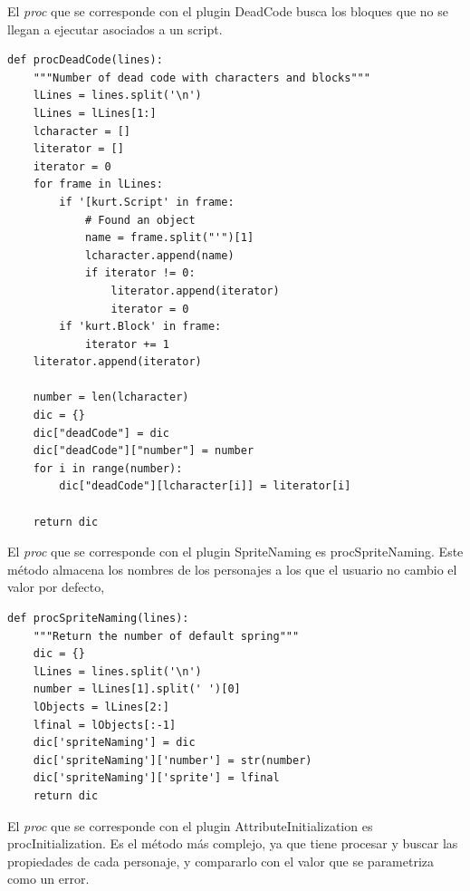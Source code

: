 \documentclass[a4paper, 12pt]{book}
\begin{document}
El \emph{proc} que se corresponde con el plugin DeadCode busca los bloques que no se
llegan a ejecutar asociados a un script.
\begingroup
\fontsize{8pt}{9pt}\selectfont
\begin{verbatim}
def procDeadCode(lines):
    """Number of dead code with characters and blocks"""
    lLines = lines.split('\n')
    lLines = lLines[1:]
    lcharacter = []
    literator = []
    iterator = 0
    for frame in lLines:
        if '[kurt.Script' in frame:
            # Found an object
            name = frame.split("'")[1]         
            lcharacter.append(name)
            if iterator != 0:
                literator.append(iterator)
                iterator = 0
        if 'kurt.Block' in frame:
            iterator += 1
    literator.append(iterator)

    number = len(lcharacter)
    dic = {}
    dic["deadCode"] = dic  
    dic["deadCode"]["number"] = number
    for i in range(number):
        dic["deadCode"][lcharacter[i]] = literator[i]
  
    return dic
\end{verbatim}
\endgroup

El \emph{proc} que se corresponde con el plugin SpriteNaming es procSpriteNaming. 
Este método almacena los nombres de los personajes a los que el usuario no 
cambio el valor por defecto,
\begingroup
\fontsize{8pt}{9pt}\selectfont
\begin{verbatim}
def procSpriteNaming(lines):
    """Return the number of default spring"""
    dic = {}
    lLines = lines.split('\n')
    number = lLines[1].split(' ')[0]
    lObjects = lLines[2:]
    lfinal = lObjects[:-1]
    dic['spriteNaming'] = dic
    dic['spriteNaming']['number'] = str(number)
    dic['spriteNaming']['sprite'] = lfinal
    return dic
\end{verbatim}
\endgroup

El \emph{proc} que se corresponde con el plugin AttributeInitialization es 
procInitialization. Es el método más complejo, ya que tiene procesar y 
buscar las propiedades de cada personaje, y compararlo con el valor que 
se parametriza como un error.
\end{document}
